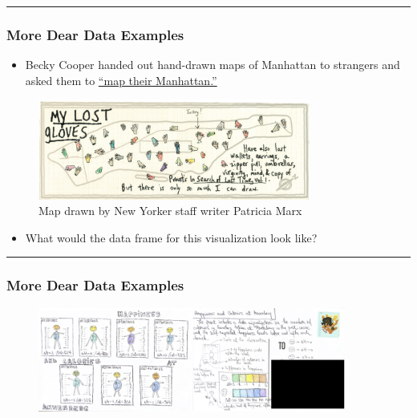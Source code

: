 \documentclass[
  letterpaper,
  DIV=11,
  numbers=noendperiod]{scrartcl}
\providecommand{\tightlist}{%
  \setlength{\itemsep}{0pt}\setlength{\parskip}{0pt}}\usepackage{longtable,booktabs,array}
\begin{document}
\begin{center}\rule{0.5\linewidth}{0.5pt}\end{center}

\hypertarget{more-dear-data-examples}{%
\subsubsection{More Dear Data Examples}\label{more-dear-data-examples}}

\begin{itemize}
\tightlist
\item
  Becky Cooper handed out hand-drawn maps of Manhattan to strangers and
  asked them to
  \href{https://www.goodreads.com/book/show/15842664-mapping-manhattan?from_search=true}{``map
  their Manhattan.''}
\end{itemize}

\begin{figure}

{\centering \includegraphics[width=0.8\textwidth,height=\textheight]{img/mapmanhattan.png}

}

\caption{Map drawn by New Yorker staff writer Patricia Marx}

\end{figure}

\begin{itemize}
\tightlist
\item
  What would the data frame for this visualization look like?
\end{itemize}

\begin{center}\rule{0.5\linewidth}{0.5pt}\end{center}

\hypertarget{more-dear-data-examples-1}{%
\subsubsection{More Dear Data
Examples}\label{more-dear-data-examples-1}}

\begin{figure}

{\centering \includegraphics[width=0.9\textwidth,height=\textheight]{img/postcards_stat100s22.001.jpeg}

}

\end{figure}
\end{document}
